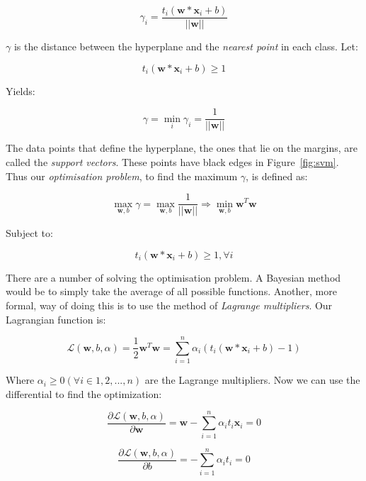 \documentclass{article}
\newcommand{\Lagr}{\mathcal{L}}
\begin{document}
\begin{multicols}{2}
\begin{equation}
	\gamma_{i} = \frac{t_{i}(\textbf{w} * \textbf{x}_{i} + b)}{\left|\left|\textbf{w}\right|\right|}
\end{equation}

$\gamma$ is the distance between the hyperplane and the \textit{nearest point} in each class. Let:

$$ t_{i}(\textbf{w} * \textbf{x}_{i} + b) \ge 1 $$

Yields:

\begin{equation}
	\gamma = \min_i \gamma_i = \frac{1}{\left|\left|\textbf{w}\right|\right|}
\end{equation}

The data points that define the hyperplane, the ones that lie on the margins, are called the \textit{support vectors}. These points have black edges in Figure~\ref{fig:svm}. Thus our \textit{optimisation problem}, to find the maximum $\gamma$, is defined as:

\begin{equation}
	 \max_{\textbf{w}, b} \gamma = \max_{\textbf{w}, b}\frac{1}{\left|\left|\textbf{w}\right|\right|} \Rightarrow \min_{\textbf{w}, b}\textbf{w}^{T}\textbf{w}
\end{equation}

Subject to:

$$ t_{i}(\textbf{w} * \textbf{x}_{i} + b) \ge 1, \forall i $$

There are a number of solving the optimisation problem. A Bayesian method would be to simply take the average of all possible functions. Another, more formal, way of doing this is to use the method of \textit{Lagrange multipliers}. Our Lagrangian function is:

\begin{equation}
	\Lagr(\textbf{w}, b, \alpha) = \frac{1}{2}\textbf{w}^{T}\textbf{w} = \sum^{n}_{i=1} \alpha_{i}(t_{i}(\textbf{w} * \textbf{x}_{i} + b)-1)
\end{equation}

Where $\alpha_{i} \ge 0 (\forall i \in 1, 2, ..., n)$ are the Lagrange multipliers. Now we can use the differential to find the optimization:

\begin{equation}
	\frac{\partial\Lagr(\textbf{w}, b, \alpha)}{\partial{\textbf{w}}} = \textbf{w} - \sum^{n}_{i=1} \alpha_{i}t_{i}\textbf{x}_{i} = 0
\end{equation}

\begin{equation}
	\frac{\partial\Lagr(\textbf{w}, b, \alpha)}{\partial{b}} = - \sum^{n}_{i=1} \alpha_{i}t_{i} = 0
\end{equation}


\end{multicols}
\end{document}
